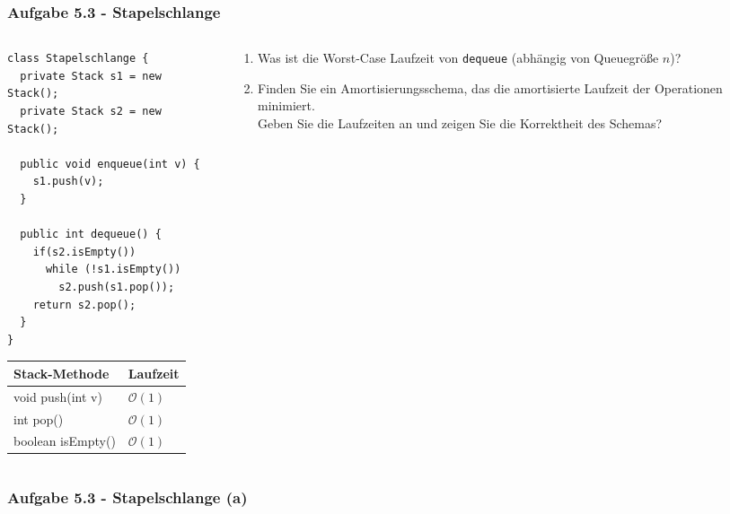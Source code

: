 \documentclass{beamer}
\begin{document}
\begin{frame}[fragile]
	\frametitle{Aufgabe 5.3 - Stapelschlange}

	\begin{columns}

		\begin{column}{0.48\textwidth}
			\begin{verbatim}
class Stapelschlange {
  private Stack s1 = new Stack();
  private Stack s2 = new Stack();

  public void enqueue(int v) {
  	s1.push(v);
  }
  
  public int dequeue() {
    if(s2.isEmpty())
      while (!s1.isEmpty())
        s2.push(s1.pop());
    return s2.pop();
  }
}
			\end{verbatim}

			{\scriptsize
			\begin{table}
				\begin{tabular}{|l|l|}
					\hline
					Stack-Methode     & Laufzeit         \\ \hline
					void push(int v)  & $\mathcal{O}(1)$ \\ \hline
					int pop()         & $\mathcal{O}(1)$ \\ \hline
					boolean isEmpty() & $\mathcal{O}(1)$ \\ \hline
				\end{tabular}
			\end{table}
			}
		\end{column}

		\begin{column}{0.48\textwidth}
			\renewcommand{\theenumi}{\alph{enumi}}
			\begin{enumerate}
				\item Was ist die Worst-Case Laufzeit von \texttt{dequeue} (abhängig von Queuegröße $n$)?
				\item Finden Sie ein Amortisierungsschema, das die amortisierte Laufzeit der Operationen minimiert. \\
				      Geben Sie die Laufzeiten an und zeigen Sie die Korrektheit des Schemas?
			\end{enumerate}
		\end{column}
	\end{columns}
\end{frame}

\begin{frame}
	\frametitle{Aufgabe 5.3 - Stapelschlange (a)}
\end{frame}
\end{document}

